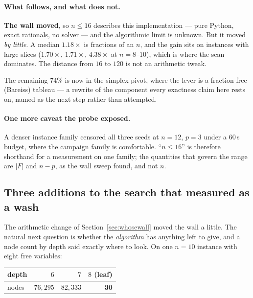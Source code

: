\documentclass[11pt,a4paper]{article}
\begin{document}
\paragraph{What follows, and what does not.}
\textbf{The wall moved}, so $n \leqslant 16$ describes this implementation ---
pure Python, exact rationals, no solver --- and the algorithmic limit is
unknown.  But it moved \emph{by little}.  A median $1.18\times$ is fractions of
an $n$, and the gain sits on instances with large slices ($1.70\times$,
$1.71\times$, $4.38\times$ at $n = 8$--$10$), which is where the scan
dominates.  The distance from $16$ to $120$ is not an arithmetic tweak.

The remaining $74\%$ is now in the simplex pivot, where the lever is a
fraction-free (Bareiss) tableau --- a rewrite of the component every exactness
claim here rests on, named as the next step rather than attempted.

\paragraph{One more caveat the probe exposed.}  A denser instance family
censored all three seeds at $n = 12$, $p = 3$ under a $60$\,s budget, where
the campaign family is comfortable.  ``$n \leqslant 16$'' is therefore
shorthand for a measurement on one family; the quantities that govern the
range are $|F|$ and $n-p$, as the wall sweep found, and not $n$.

\subsection{Three additions to the search that measured as a wash}
\label{sec:congruence}

The arithmetic change of Section~\ref{sec:whosewall} moved the wall a little.
The natural next question is whether the \emph{algorithm} has anything left to
give, and a node count by depth said exactly where to look.  On one $n=10$
instance with eight free variables:

\begin{center}
\begin{tabular}{lrrr}
\toprule
depth & $6$ & $7$ & $8$ (leaf) \\
\midrule
nodes & $76{,}295$ & $82{,}333$ & $\mathbf{30}$ \\
\bottomrule
\end{tabular}
\end{center}
\end{document}
